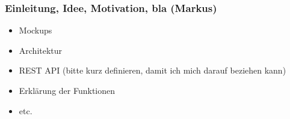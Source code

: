 \subsubsection{Einleitung, Idee, Motivation, bla
(Markus)}\label{einleitung-idee-motivation-bla-markus}

\begin{itemize}
\itemsep1pt\parskip0pt
\item
  Mockups
\item
  Architektur
\item
  REST API (bitte kurz definieren, damit ich mich darauf beziehen kann)
\item
  Erklärung der Funktionen
\item
  etc.
\end{itemize}